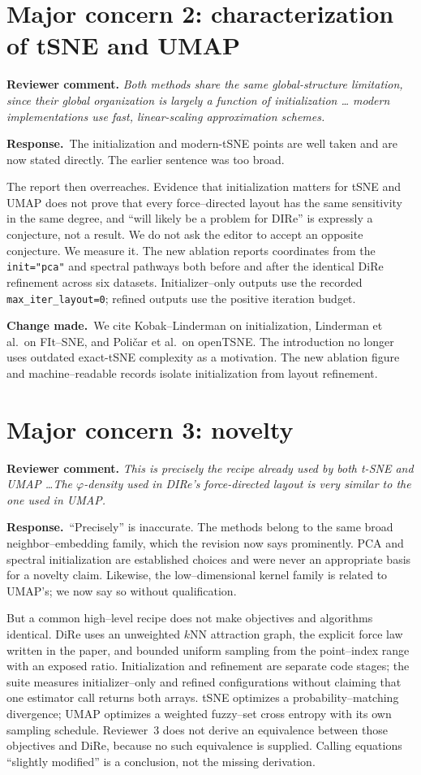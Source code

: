 \documentclass[11pt]{article}
\newcommand{\reviewcomment}[1]{%
  \medskip\noindent\textbf{Reviewer comment.} \emph{#1}\par\smallskip}
\newcommand{\response}{%
  \noindent\textcolor{responseblue}{\textbf{Response.}}\ }
\newcommand{\change}{%
  \noindent\textcolor{responseblue}{\textbf{Change made.}}\ }
\begin{document}
\section*{Major concern 2: characterization of tSNE and UMAP}

\reviewcomment{Both methods share the same global-structure limitation, since
their global organization is largely a function of initialization \ldots
modern implementations use fast, linear-scaling approximation schemes.}

\response The initialization and modern-tSNE points are well taken and are now
stated directly. The earlier sentence was too broad.

The report then overreaches. Evidence that initialization matters for tSNE and
UMAP does not prove that every force--directed layout has the same sensitivity
in the same degree, and ``will likely be a problem for DIRe'' is expressly a
conjecture, not a result. We do not ask the editor to accept an opposite
conjecture. We measure it. The new ablation reports coordinates from the
\texttt{init="pca"} and spectral pathways both before and after the identical
DiRe refinement across six datasets. Initializer--only outputs use the recorded
\texttt{max\_iter\_layout=0}; refined outputs use the positive iteration
budget.

\change We cite Kobak--Linderman on initialization, Linderman et al.\ on
FIt--SNE, and Poličar et al.\ on openTSNE. The introduction no longer uses
outdated exact-tSNE complexity as a motivation. The new ablation figure and
machine--readable records isolate initialization from layout refinement.

\section*{Major concern 3: novelty}

\reviewcomment{This is precisely the recipe already used by both t-SNE and
UMAP \ldots The $\varphi$-density used in DIRe's force-directed layout is very
similar to the one used in UMAP.}

\response ``Precisely'' is inaccurate. The methods belong to the same broad
neighbor--embedding family, which the revision now says prominently. PCA and
spectral initialization are established choices and were never an appropriate
basis for a novelty claim. Likewise, the low--dimensional kernel family is
related to UMAP's; we now say so without qualification.

But a common high--level recipe does not make objectives and algorithms
identical. DiRe uses an unweighted $k$NN attraction graph, the explicit force
law written in the paper, and bounded uniform sampling from the point--index
range with an exposed ratio. Initialization and refinement are separate code
stages; the suite measures initializer--only and refined configurations without
claiming that one estimator call returns both arrays. tSNE optimizes a
probability--matching divergence; UMAP optimizes a weighted fuzzy--set cross
entropy with its own sampling schedule. Reviewer~3 does not derive an
equivalence between those objectives and DiRe, because no such equivalence is
supplied. Calling equations ``slightly modified'' is a conclusion, not the
missing derivation.
\end{document}
